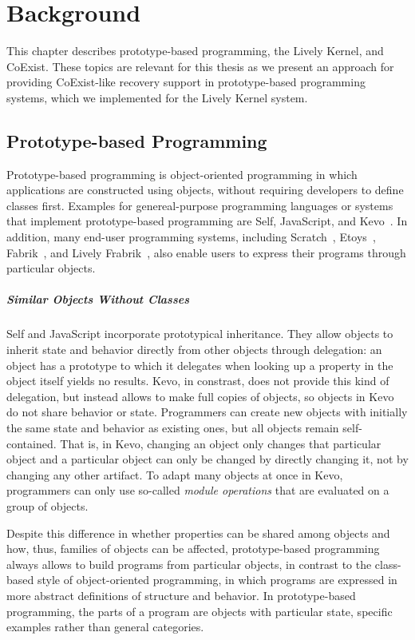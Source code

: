 \chapter{Background} \label{chapter:BACKGROUND}

This chapter describes prototype-based programming, the Lively Kernel, and CoExist.
These topics are relevant for this thesis as we present an approach for providing CoExist-like recovery support in prototype-based programming systems, which we implemented for the Lively Kernel system.

\section{Prototype-based Programming}

Prototype-based programming is object-oriented programming in which applications are constructed using objects, without requiring developers to define classes first.
Examples for genereal-purpose programming languages or systems that implement prototype-based programming are Self, JavaScript, and Kevo~\cite{Taivalsaari1992Kevo}.
In addition, many end-user programming systems, including Scratch~\cite{Maloney2010SPL}, Etoys~\cite{Kay2005Etoys}, Fabrik~\cite{Ingalls1988FVP}, and Lively Frabrik~\cite{Lincke2009LFW}, also enable users to express their programs through particular objects.

\paragraph{Similar Objects Without Classes}
Self and JavaScript incorporate prototypical inheritance.
They allow objects to inherit state and behavior directly from other objects through delegation: an object has a prototype to which it delegates when looking up a property in the object itself yields no results.
Kevo, in constrast, does not provide this kind of delegation, but instead allows to make full copies of objects, so objects in Kevo do not share behavior or state.
Programmers can create new objects with initially the same state and behavior as existing ones, but all objects remain self-contained.
That is, in Kevo, changing an object only changes that particular object and a particular object can only be changed by directly changing it, not by changing any other artifact.
To adapt many objects at once in Kevo, programmers can only use so-called \emph{module operations} that are evaluated on a group of objects. 

Despite this difference in whether properties can be shared among objects and how, thus, families of objects can be affected, prototype-based programming always allows to build programs from particular objects, in contrast to the class-based style of object-oriented programming, in which programs are expressed in more abstract definitions of structure and behavior.
In prototype-based programming, the parts of a program are objects with particular state, specific examples rather than general categories.

